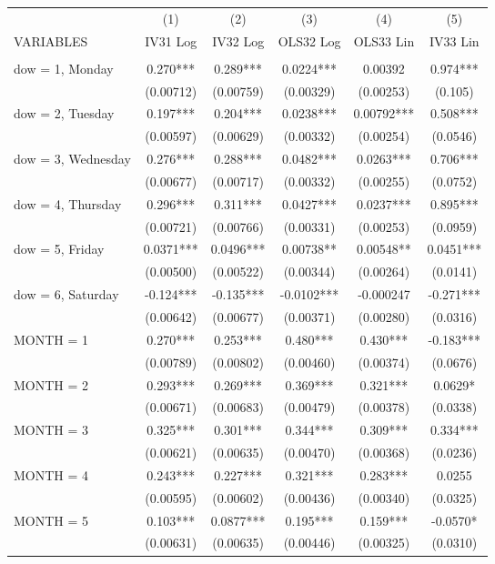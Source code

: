 \begin{tabular}{lccccc} \hline
 & (1) & (2) & (3) & (4) & (5) \\
VARIABLES & IV31 Log & IV32 Log & OLS32 Log & OLS33 Lin & IV33 Lin \\ \hline
 &  &  &  &  &  \\
dow = 1, Monday & 0.270*** & 0.289*** & 0.0224*** & 0.00392 & 0.974*** \\
 & (0.00712) & (0.00759) & (0.00329) & (0.00253) & (0.105) \\
dow = 2, Tuesday & 0.197*** & 0.204*** & 0.0238*** & 0.00792*** & 0.508*** \\
 & (0.00597) & (0.00629) & (0.00332) & (0.00254) & (0.0546) \\
dow = 3, Wednesday & 0.276*** & 0.288*** & 0.0482*** & 0.0263*** & 0.706*** \\
 & (0.00677) & (0.00717) & (0.00332) & (0.00255) & (0.0752) \\
dow = 4, Thursday & 0.296*** & 0.311*** & 0.0427*** & 0.0237*** & 0.895*** \\
 & (0.00721) & (0.00766) & (0.00331) & (0.00253) & (0.0959) \\
dow = 5, Friday & 0.0371*** & 0.0496*** & 0.00738** & 0.00548** & 0.0451*** \\
 & (0.00500) & (0.00522) & (0.00344) & (0.00264) & (0.0141) \\
dow = 6, Saturday & -0.124*** & -0.135*** & -0.0102*** & -0.000247 & -0.271*** \\
 & (0.00642) & (0.00677) & (0.00371) & (0.00280) & (0.0316) \\
MONTH = 1 & 0.270*** & 0.253*** & 0.480*** & 0.430*** & -0.183*** \\
 & (0.00789) & (0.00802) & (0.00460) & (0.00374) & (0.0676) \\
MONTH = 2 & 0.293*** & 0.269*** & 0.369*** & 0.321*** & 0.0629* \\
 & (0.00671) & (0.00683) & (0.00479) & (0.00378) & (0.0338) \\
MONTH = 3 & 0.325*** & 0.301*** & 0.344*** & 0.309*** & 0.334*** \\
 & (0.00621) & (0.00635) & (0.00470) & (0.00368) & (0.0236) \\
MONTH = 4 & 0.243*** & 0.227*** & 0.321*** & 0.283*** & 0.0255 \\
 & (0.00595) & (0.00602) & (0.00436) & (0.00340) & (0.0325) \\
MONTH = 5 & 0.103*** & 0.0877*** & 0.195*** & 0.159*** & -0.0570* \\
 & (0.00631) & (0.00635) & (0.00446) & (0.00325) & (0.0310) \\

\end{tabular}
